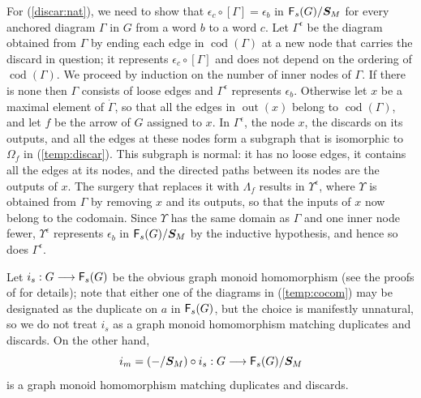 \documentclass[12pt]{amsart}
\theoremstyle{plain}
\theoremstyle{definition}
\theoremstyle{remark}
\numberwithin{equation}{section}
\theoremstyle{plain}
\DeclareMathOperator{\cod}{cod}
\newcommand{\0}{\emptyset}
\newcommand{\fun}{\longrightarrow}
\DeclareMathOperator{\out}{out}
\newcommand{\cat}[1]{\textup{\textsf{#1}}}
\begin{document}
For (\ref{discar:nat}), we need to show that $\epsilon_c \circ [\Gamma] = \epsilon_b$ in $\cat F_s(G) / \bm S_M$ for every anchored diagram $\Gamma$ in $G$ from a word $b$ to a word $c$. Let $\Gamma^{\epsilon}$ be the diagram obtained from $\Gamma$ by ending each edge in $\cod(\Gamma)$ at a new node that carries the discard in question; it represents $\epsilon_c \circ [\Gamma]$ and does not depend on the ordering of $\cod(\Gamma)$. We proceed by induction on the number of inner nodes of $\Gamma$. If there is none then $\Gamma$ consists of loose edges and $\Gamma^{\epsilon}$ represents $\epsilon_b$. Otherwise let $x$ be a maximal element of $\dot \Gamma$, so that all the edges in $\out(x)$ belong to $\cod(\Gamma)$, and let $f$ be the arrow of $G$ assigned to $x$. In $\Gamma^{\epsilon}$, the node $x$, the discards on its outputs, and all the edges at these nodes form a subgraph that is isomorphic to $\Omega_f$ in (\ref{temp:discar}). This subgraph is normal: it has no loose edges, it contains all the edges at its nodes, and the directed paths between its nodes are the outputs of $x$. The surgery that replaces it with $\Lambda_f$ results in $\Upsilon^{\epsilon}$, where $\Upsilon$ is obtained from $\Gamma$ by removing $x$ and its outputs, so that the inputs of $x$ now belong to the codomain. Since $\Upsilon$ has the same domain as $\Gamma$ and one inner node fewer, $\Upsilon^{\epsilon}$ represents $\epsilon_b$ in $\cat F_s(G) / \bm S_M$ by the inductive hypothesis, and hence so does $\Gamma^{\epsilon}$.

Let $i_s : G \fun \cat F_s(G)$ be the obvious graph monoid homomorphism (see the proofs of \cite[Theorems~1.2, 2.3]{joyal1991geometry} for details); note that either one of the diagrams in (\ref{temp:cocom}) may be designated as the duplicate on $a$ in $\cat F_s(G)$, but the choice is manifestly unnatural, so we do not treat $i_s$ as a graph monoid homomorphism matching duplicates and discards. On the other hand,
\[
i_m = (- / \bm S_M ) \circ i_s: G \fun \cat F_s(G) / \bm S_M
\]
is a graph monoid homomorphism matching duplicates and discards.
\end{document}
